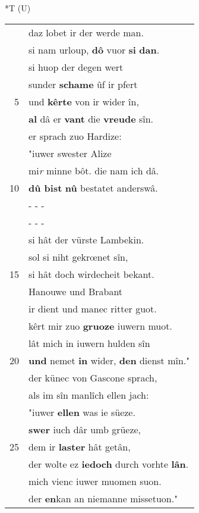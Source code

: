 \documentclass[8pt,a4paper,notitlepage]{article}
\begin{document}
\begin{table}[ht]
\begin{minipage}[t]{0.5\linewidth}
\end{minipage}
\hspace{0.5cm}
\begin{minipage}[t]{0.5\linewidth}
\small
\begin{center}*T (U)
\end{center}
\begin{tabular}{rl}
 & daz lobet ir der werde man.\\ 
 & si nam urloup, \textbf{dô} vuor \textbf{si} \textbf{dan}.\\ 
 & si huop der degen wert\\ 
 & sunder \textbf{schame} ûf ir pfert\\ 
5 & und \textbf{kêrte} von ir wider în,\\ 
 & \textbf{al} dâ er \textbf{vant} die \textbf{vreude} sîn.\\ 
 & er sprach zuo Hardize:\\ 
 & "iuwer swester Alize\\ 
 & mi\textit{r} minne bôt. die nam ich dâ.\\ 
10 & \textbf{dû bist} \textbf{nû} bestatet anderswâ.\\ 
 & \multicolumn{1}{l}{ - - - }\\ 
 & \multicolumn{1}{l}{ - - - }\\ 
 & si hât der vürste Lambekin.\\ 
 & sol si niht gekrœnet sîn,\\ 
15 & si hât doch wirdecheit bekant.\\ 
 & Hanouwe und Brabant\\ 
 & ir dient und manec ritter guot.\\ 
 & kêrt mir zuo \textbf{gruoze} iuwern muot.\\ 
 & lât mich in iuwern hulden sîn\\ 
20 & \textbf{und} nemet \textbf{in} wider, \textbf{den} dienst mîn."\\ 
 & der künec von Gascone sprach,\\ 
 & als im sîn manlîch ellen jach:\\ 
 & "iuwer \textbf{ellen} was ie süeze.\\ 
 & \textbf{swer} iuch dâr umb grüeze,\\ 
25 & dem ir \textbf{laster} hât getân,\\ 
 & der wolte ez \textbf{iedoch} durch vorhte \textbf{lân}.\\ 
 & mich vienc iuwer muomen suon.\\ 
 & der \textbf{en}kan an niemanne missetuon."\\ 

\end{tabular}
\end{minipage}
\end{table}
\end{document}

